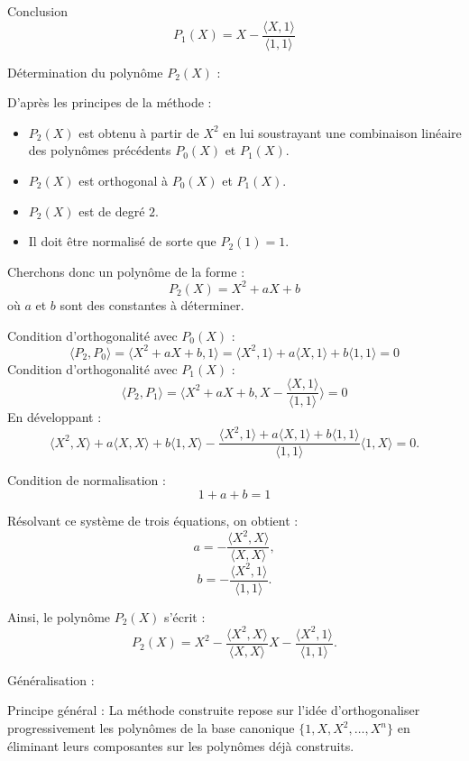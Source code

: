 \documentclass[10pt,a4paper]{article}
\begin{document}
Conclusion
\[
P_1(X) = X - \frac{\langle X, 1 \rangle}{\langle 1, 1 \rangle}
\]


\q Détermination du polynôme \( P_2(X) \) :

D'après les principes de la méthode :
\begin{itemize}
    \item \( P_2(X) \) est obtenu à partir de \( X^2 \) en lui soustrayant une combinaison linéaire des polynômes précédents \( P_0(X) \) et \( P_1(X) \).
    \item \( P_2(X) \) est orthogonal à \( P_0(X) \) et \( P_1(X) \).
    \item \( P_2(X) \) est de degré \( 2 \).
    \item Il doit être normalisé de sorte que \( P_2(1) = 1 \).
\end{itemize}

Cherchons donc un polynôme de la forme :
\[
P_2(X) = X^2 + aX + b
\]
où \( a \) et \( b \) sont des constantes à déterminer.

Condition d'orthogonalité avec \( P_0(X) \) :
\[
\langle P_2, P_0 \rangle = \langle X^2 + aX + b, 1 \rangle = \langle X^2, 1 \rangle + a \langle X, 1 \rangle + b \langle 1, 1 \rangle = 0
\]
Condition d'orthogonalité avec \( P_1(X) \) :
\[
\langle P_2, P_1 \rangle = \langle X^2 + aX + b, X - \frac{\langle X, 1 \rangle}{\langle 1, 1 \rangle} \rangle = 0
\]
En développant :
\[
\langle X^2, X \rangle + a \langle X, X \rangle + b \langle 1, X \rangle - \frac{\langle X^2, 1 \rangle + a \langle X, 1 \rangle + b \langle 1, 1 \rangle}{\langle 1, 1 \rangle} \langle 1, X \rangle = 0.
\]

Condition de normalisation :
\[
1 + a + b = 1
\]

Résolvant ce système de trois équations, on obtient :
\[
a = -\frac{\langle X^2, X \rangle}{\langle X, X \rangle},
\]
\[
b = -\frac{\langle X^2, 1 \rangle}{\langle 1, 1 \rangle}.
\]

Ainsi, le polynôme \( P_2(X) \) s'écrit :
\[
P_2(X) = X^2 - \frac{\langle X^2, X \rangle}{\langle X, X \rangle} X - \frac{\langle X^2, 1 \rangle}{\langle 1, 1 \rangle}.
\]


\q Généralisation :

Principe général : La méthode construite repose sur l'idée d'orthogonaliser progressivement les
polynômes de la base canonique \( \{1, X, X^2, \dots, X^n\} \) en éliminant leurs composantes sur
les polynômes déjà construits.
\end{document}
